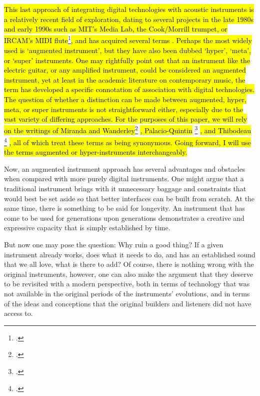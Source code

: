 \documentclass[12pt,twoside,maitrise]{dms_ks}
\theoremstyle{definition}
\begin{document}

\hl{This last approach of integrating digital technologies with acoustic instruments is a relatively recent field of exploration, dating to several projects in the late 1980s and early 1990s such as MIT's Media Lab, the Cook/Morrill trumpet, or IRCAM's MIDI flute}\footcite[22--25]{miranda_new_2006}\hl{, and has acquired several terms .
Perhaps the most widely used is `augmented instrument', but they have also been dubbed `hyper', `meta', or `super' instruments.
One may rightfully point out that an instrument like the electric guitar, or any amplified instrument, could be considered an augmented instrument, yet at least in the academic literature on contemporary music, the term has developed a specific connotation of association with digital technologies. 
The question of whether a distinction can be made between augmented, hyper, meta, or super instruments is not straightforward either, especially due to the vast variety of differing approaches.
For the purposes of this paper, we will rely on the writings of Miranda and Wanderley}\footcite[21]{miranda_new_2006} \hl{, Palacio-Quintin} \footcite[25]{palacio-quintin_composition_2012-1} \hl{, and Thibodeau } \footcite[1]{thibodeau_trumpet_2011} \hl{, all of which treat these terms as being synonymous.
Going forward, I will use the terms augmented or hyper-instruments interchangeably.}


Now, an augmented instrument approach has several advantages and obstacles when compared with more purely digital instruments. 
One might argue that a traditional instrument brings with it unnecessary baggage and constraints that would best be set aside so that better interfaces can be built from scratch.  
At the same time, there is something to be said for longevity.
An instrument that has come to be used for generations upon generations demonstrates a creative and expressive capacity that is simply established by time.

But now one may pose the question: Why ruin a good thing?
If a given instrument already works, does what it needs to do, and has an established sound that we all love, what is there to add?
Of course, there is nothing wrong with the original instruments, however, one can also make the argument that they deserve to be revisited with a modern perspective, both in terms of technology that was not available in the original periods of the instruments' evolutions, and in terms of the ideas and conceptions that the original builders and listeners did not have access to. 
\end{document}
